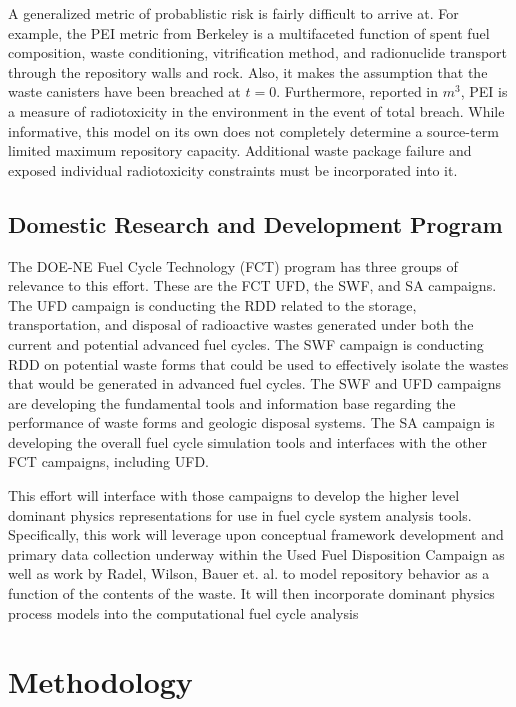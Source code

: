 A generalized metric of probablistic risk is fairly difficult to 
arrive at. For example, the \gls{PEI} metric from Berkeley 
\cite{bouvier_comparison_2007} is a multifaceted 
function of spent fuel composition, waste conditioning, vitrification 
method, and radionuclide transport through the repository walls and 
rock.  Also, it makes the assumption that the waste canisters have 
been breached at $t=0$. Furthermore, reported in $m^3$, PEI is a 
measure of radiotoxicity in the environment in the event of total 
breach. While informative, this model on its own does not completely 
determine a source-term limited maximum repository capacity.  
Additional waste package failure and exposed individual radiotoxicity 
constraints must be incorporated into it.


\subsection{Domestic Research and Development Program}

The DOE-NE Fuel Cycle Technology (FCT) program has three groups of relevance to 
this effort.  These are the \gls{FCT} \gls{UFD}, the \gls{SWF}, and \gls{SA} 
campaigns.  The \gls{UFD} campaign is conducting the \gls{RDD} related to the 
storage, transportation, and disposal of radioactive wastes generated under both 
the current and potential advanced fuel cycles.  The SWF campaign is conducting 
\gls{RDD} on potential waste forms that could be used to effectively isolate 
the wastes that would be generated in advanced fuel cycles.  The \gls{SWF} and
\gls{UFD} campaigns are developing the fundamental tools and information base 
regarding the performance of waste forms and geologic disposal systems.  The 
\gls{SA} campaign is developing the overall fuel cycle simulation tools and 
interfaces with the other FCT campaigns, including \gls{UFD}.  

This effort will interface with those campaigns to develop the higher level
dominant physics representations for use in fuel cycle system analysis tools.
Specifically, this work will leverage upon conceptual framework development and
primary data collection underway within the Used Fuel Disposition Campaign as
well as work by Radel, Wilson, Bauer et. al. to model repository behavior as a
function of the contents of the waste.  It will then incorporate dominant
physics process models into the \Cyclus computational fuel cycle analysis




\section{Methodology} 

